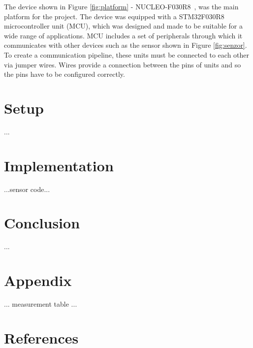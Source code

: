 \documentclass[11pt,a4paper]{article}
\begin{document}
\indent The device shown in Figure \ref{fig:platform} - NUCLEO-F030R8~\cite{PLATFORM}, was the main platform for the project. The device was equipped with a STM32F030R8~\cite{MCU} microcontroller unit (MCU), which was designed and made to be suitable for a wide range of applications. MCU includes a set of peripherals through which it communicates with other devices such as the sensor shown in Figure \ref{fig:senzor}. To create a communication pipeline, these units must be connected to each other via jumper wires. Wires provide a connection between the pins of units and so the pins have to be configured correctly.

\newpage %

\section{Setup}

...

\section{Implementation}

...sensor code\cite{SENSOR}...

\section{Conclusion}

...

\newpage %

\section{Appendix}

... measurement table ...

\newpage %

\section{References}

\begin{flushleft}
    
\end{flushleft}


\end{document}
